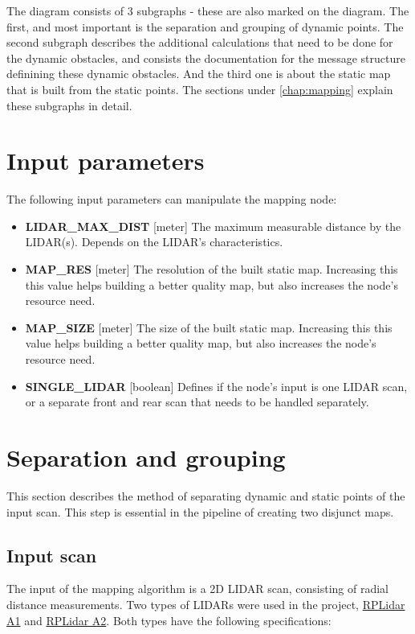 The diagram consists of 3 subgraphs - these are also marked on the diagram. The first, and most important is the separation and grouping of dynamic points. The second subgraph describes the additional calculations that need to be done for the dynamic obstacles, and consists the documentation for the message structure definining these dynamic obstacles. And the third one is about the static map that is built from the static points. The sections under \ref{chap:mapping} explain these subgraphs in detail.

\begin{minipage}{\textwidth}
\section{Input parameters}
\label{chap:input_parameters}
The following input parameters can manipulate the mapping node:

\begin{itemize}
\item\textbf{LIDAR\_MAX\_DIST} [meter] The maximum measurable distance by the LIDAR(s). Depends on the LIDAR's characteristics.
\item\textbf{MAP\_RES} [meter] The resolution of the built static map. Increasing this this value helps building a better quality map, but also increases the node's resource need.
\item\textbf{MAP\_SIZE} [meter] The size of the built static map. Increasing this this value helps building a better quality map, but also increases the node's resource need.
\item \textbf{SINGLE\_LIDAR} [boolean] Defines if the node's input is one LIDAR scan, or a separate front and rear scan that needs to be handled separately.
\end{itemize}
\end{minipage}

\section{Separation and grouping}
\label{chap:separation_and_grouping}
This section describes the method of separating dynamic and static points of the input scan. This step is essential in the pipeline of creating two disjunct maps.

\subsection{Input scan}
The input of the mapping algorithm is a 2D LIDAR scan, consisting of radial distance measurements. Two types of LIDARs were used in the project, \href{http://www.slamtec.com/en/lidar/a1}{RPLidar A1} and \href{http://www.slamtec.com/en/lidar/a2}{RPLidar A2}.
Both types have the following specifications:


